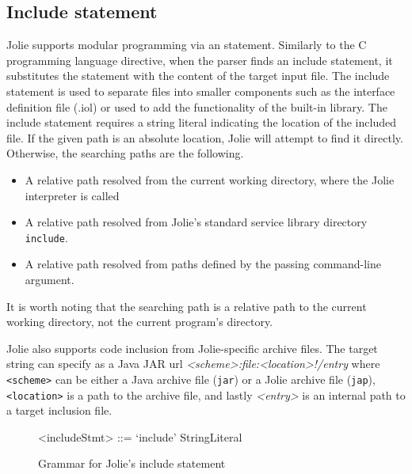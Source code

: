 \subsection{Include statement}
\label{sec:jolie-include}

Jolie supports modular programming via an  statement. Similarly to the C programming language  directive, when the parser finds an include statement, it substitutes the statement with the content of the target input file. The include statement is used to separate files into smaller components such as the interface definition file (.iol) or used to add the functionality of the built-in library. The include statement requires a string literal indicating the location of the included file. If the given path is an absolute location, Jolie will attempt to find it directly. Otherwise, the searching paths are the following.

\begin{itemize}
    \item A relative path resolved from the current working directory, where the Jolie interpreter is called
    \item A relative path resolved from Jolie's standard service library directory \texttt{include}.
    \item A relative path resolved from paths defined by the passing command-line argument.
\end{itemize}

It is worth noting that the searching path is a relative path to the current working directory, not the current program's directory.

Jolie also supports code inclusion from Jolie-specific archive files.
The target string can specify as a Java JAR url \textit{<scheme>:file:<location>\newline!/{entry}} where \texttt{<scheme>} can be either a Java archive file (\texttt{jar}) or a Jolie archive file (\texttt{jap}), \texttt{<location>} is a path to the archive file, and lastly \textit{<entry>} is an internal path to a target inclusion file.

\begin{figure}[h]
    \begin{framed}
        \begin{grammar}
            <includeStmt> ::= `include' StringLiteral
        \end{grammar}
    \end{framed}
    \caption{Grammar for Jolie's include statement}
    \label{fig:jolie-include}
\end{figure}

